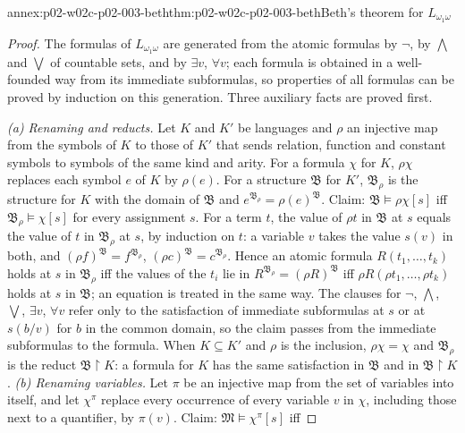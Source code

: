 \begin{annexitem}{annex:p02-w02c-p02-003-beth}{thm:p02-w02c-p02-003-beth}{Beth's theorem for \(L_{\omega_1\omega}\)}
\begin{proof}
The formulas of \(L_{\omega_1\omega}\) are generated from the atomic
formulas by \(\neg\), by \(\bigwedge\) and \(\bigvee\) of countable sets,
and by \(\exists v\), \(\forall v\); each formula is obtained in a
well-founded way from its immediate subformulas, so properties of all
formulas can be proved by induction on this generation.  Three auxiliary
facts are proved first.

\emph{(a) Renaming and reducts.}  Let \(K\) and \(K'\) be languages and
\(\rho\) an injective map from the symbols of \(K\) to those of \(K'\)
that sends relation, function and constant symbols to symbols of the same
kind and arity.  For a formula \(\chi\) for \(K\), \(\rho\chi\) replaces
each symbol \(e\) of \(K\) by \(\rho(e)\).  For a structure \(\mathfrak B\)
for \(K'\), \(\mathfrak B_\rho\) is the structure for \(K\) with the domain
of \(\mathfrak B\) and \(e^{\mathfrak B_\rho}=\rho(e)^{\mathfrak B}\).
Claim: \(\mathfrak B\models\rho\chi[s]\) iff
\(\mathfrak B_\rho\models\chi[s]\) for every assignment \(s\).  For a term
\(t\), the value of \(\rho t\) in \(\mathfrak B\) at \(s\) equals the value
of \(t\) in \(\mathfrak B_\rho\) at \(s\), by induction on \(t\): a variable
\(v\) takes the value \(s(v)\) in both, and
\((\rho f)^{\mathfrak B}=f^{\mathfrak B_\rho}\),
\((\rho c)^{\mathfrak B}=c^{\mathfrak B_\rho}\).  Hence an atomic formula
\(R(t_1,\ldots,t_k)\) holds at \(s\) in \(\mathfrak B_\rho\) iff the values
of the \(t_i\) lie in \(R^{\mathfrak B_\rho}=(\rho R)^{\mathfrak B}\) iff
\(\rho R(\rho t_1,\ldots,\rho t_k)\) holds at \(s\) in \(\mathfrak B\); an
equation is treated in the same way.  The clauses for \(\neg\),
\(\bigwedge\), \(\bigvee\), \(\exists v\), \(\forall v\) refer only to the
satisfaction of immediate subformulas at \(s\) or at \(s(b/v)\) for
\(b\) in the common domain, so the claim passes from the immediate
subformulas to the formula.  When \(K\subseteq K'\) and \(\rho\) is the
inclusion, \(\rho\chi=\chi\) and \(\mathfrak B_\rho\) is the reduct
\(\mathfrak B\restriction K\): a formula for \(K\) has the same
satisfaction in \(\mathfrak B\) and in \(\mathfrak B\restriction K\).
\emph{(b) Renaming variables.}  Let \(\pi\) be an injective map from the
set of variables into itself, and let \(\chi^{\pi}\) replace every
occurrence of every variable \(v\) in \(\chi\), including those next to a
quantifier, by \(\pi(v)\).  Claim: \(\mathfrak M\models\chi^{\pi}[s]\) iff

\end{proof}
\end{annexitem}
